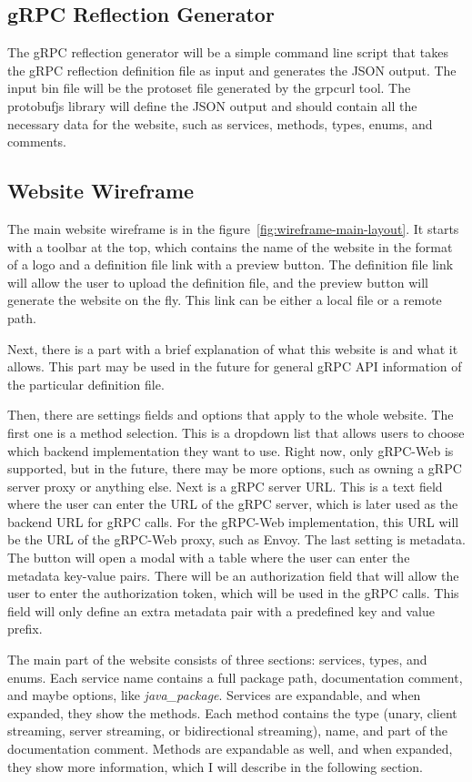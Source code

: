 \subsection{gRPC Reflection Generator}
The gRPC reflection generator will be a simple command line script that takes the gRPC reflection definition file as input and generates the JSON output.
The input bin file will be the protoset file generated by the grpcurl tool.
The protobufjs library will define the JSON output and should contain all the necessary data for the website, such as services, methods, types, enums, and comments.

\subsection{Website Wireframe}
The main website wireframe is in the figure~\ref{fig:wireframe-main-layout}.
It starts with a toolbar at the top, which contains the name of the website in the format of a logo and a definition file link with a preview button.
The definition file link will allow the user to upload the definition file, and the preview button will generate the website on the fly.
This link can be either a local file or a remote path.

Next, there is a part with a brief explanation of what this website is and what it allows.
This part may be used in the future for general gRPC API information of the particular definition file.

Then, there are settings fields and options that apply to the whole website.
The first one is a method selection.
This is a dropdown list that allows users to choose which backend implementation they want to use.
Right now, only gRPC-Web is supported, but in the future, there may be more options, such as owning a gRPC server proxy or anything else.
Next is a gRPC server URL\@.
This is a text field where the user can enter the URL of the gRPC server, which is later used as the backend URL for gRPC calls.
For the gRPC-Web implementation, this URL will be the URL of the gRPC-Web proxy, such as Envoy.
The last setting is metadata.
The button will open a modal with a table where the user can enter the metadata key-value pairs.
There will be an authorization field that will allow the user to enter the authorization token, which will be used in the gRPC calls.
This field will only define an extra metadata pair with a predefined key and value prefix.

The main part of the website consists of three sections: services, types, and enums.
Each service name contains a full package path, documentation comment, and maybe options, like \textit{java\_package}.
Services are expandable, and when expanded, they show the methods.
Each method contains the type (unary, client streaming, server streaming, or bidirectional streaming), name, and part of the documentation comment.
Methods are expandable as well, and when expanded, they show more information, which I will describe in the following section.

